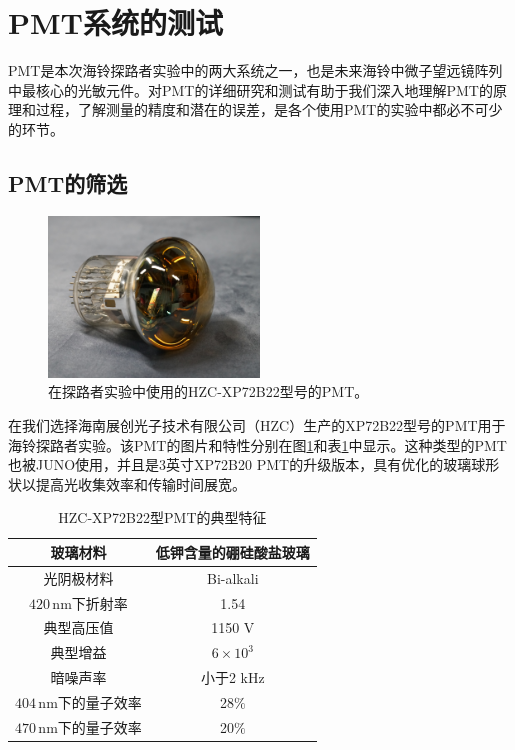 \section{PMT系统的测试}

PMT是本次海铃探路者实验中的两大系统之一，也是未来海铃中微子望远镜阵列中最核心的光敏元件。对PMT的详细研究和测试有助于我们深入地理解PMT的原理和过程，了解测量的精度和潜在的误差，是各个使用PMT的实验中都必不可少的环节\cite{KM3NeT_PMT:2018, IceCube_PMT:2019, JUNO_PMT:2022}。

\subsection{PMT的筛选}

\begin{figure}[ht]
    \centering
    \includegraphics[width=0.5\textwidth]{img/pmt_image.jpg}
    \caption{在探路者实验中使用的HZC-XP72B22型号的PMT。}
    \label{fig:pmt_view}
\end{figure}

在我们选择海南展创光子技术有限公司（HZC）生产的XP72B22型号的PMT用于海铃探路者实验。该PMT的图片和特性分别在图\ref{fig:pmt_view}和表\ref{tab:pmt_properties}中显示。这种类型的PMT也被JUNO使用，并且是3英寸XP72B20 PMT的升级版本，具有优化的玻璃球形状以提高光收集效率和传输时间展宽\cite{JUNO_PMT:2021}。

\begin{table}[ht]
    \centering
    \caption{HZC-XP72B22型PMT的典型特征}
    \begin{tabular}{c|c}
        \hline
        玻璃材料 & 低钾含量的硼硅酸盐玻璃 \\
        \hline 
        光阴极材料 & Bi-alkali \\
        \hline
        $420\,\mathrm{nm}$下折射率 & 1.54 \\
         \hline
         典型高压值 & 1150 V \\
         \hline
         典型增益 & $6\times 10^3$ \\
         \hline
         暗噪声率 & 小于2 kHz \\ 
         \hline
         $404\,\mathrm{nm}$下的量子效率 & 28$\%$ \\
         \hline
         $470\,\mathrm{nm}$下的量子效率 & 20$\%$ \\
         \hline 
    \end{tabular}
    \label{tab:pmt_properties}
\end{table}

